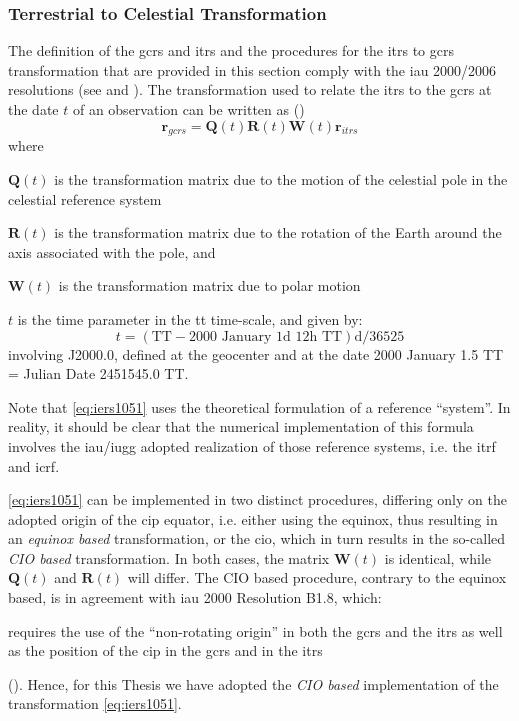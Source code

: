\subsubsection{Terrestrial to Celestial Transformation}\label{sssec:itrs-to-gcrs}

The definition of the \gls{gcrs} and \gls{itrs} and the procedures for the \gls{itrs} 
to \gls{gcrs} transformation that are provided in this section comply with the 
\gls{iau} 2000/2006 resolutions (see \cite{Capitaine2006} and \cite{iauWGnfa}). 
The transformation used to relate the \gls{itrs} to the \gls{gcrs} at the date $t$ 
of an observation can be written as (\cite{iers2010})
\begin{equation}\label{eq:iers1051}
    \bm{r}_{gcrs} = \bm{Q}(t) \bm{R}(t) \bm{W}(t) \bm{r}_{itrs}
\end{equation}
where
\begin{description}
    \item $\bm{Q}(t)$ is the transformation matrix due to the motion of 
        the celestial pole in the celestial reference system 
    \item $\bm{R}(t)$ is the transformation matrix due to the rotation 
        of the Earth around the axis associated with the pole, and
    \item $\bm{W}(t)$ is the transformation matrix due to polar motion
    \item $t$ is the time parameter in the \gls{tt} time-scale, and given by:
    \begin{equation}
        t = (\text{TT} - \text{2000 January 1d 12h TT}) \si{\day} / 36525
    \end{equation}
    involving J2000.0, defined at the geocenter and at the date 2000 January 1.5 TT 
    = Julian Date 2451545.0 TT.
\end{description}
Note that \ref{eq:iers1051} uses the theoretical formulation of a reference ``system''. 
In reality, it should be clear that the numerical implementation of this formula 
involves the \gls{iau}/\gls{iugg} adopted realization of those reference systems, i.e. 
the \gls{itrf} and \gls{icrf}.

\ref{eq:iers1051} can be implemented in two distinct procedures, differing only on the 
adopted origin of the \gls{cip} equator, i.e. either using the equinox, thus resulting 
in an \emph{equinox based} transformation, or the \gls{cio}, which in turn results in 
the so-called \emph{CIO based} transformation. In both cases, the matrix $\bm{W}(t)$ is 
identical, while $\bm{Q}(t)$ and $\bm{R}(t)$ will differ. The CIO based
procedure, contrary to the equinox based, is in agreement with \gls{iau} 2000 Resolution B1.8, 
which:
\begin{displayquote}
requires the use of the ``non-rotating origin'' in both the \gls{gcrs} and the 
\gls{itrs} as well as the position of the \gls{cip} in the \gls{gcrs} and in the 
\gls{itrs} 
\end{displayquote}
(\cite{iers2010}). Hence, for this Thesis we have adopted the \emph{CIO based} 
implementation of the transformation \ref{eq:iers1051}.

